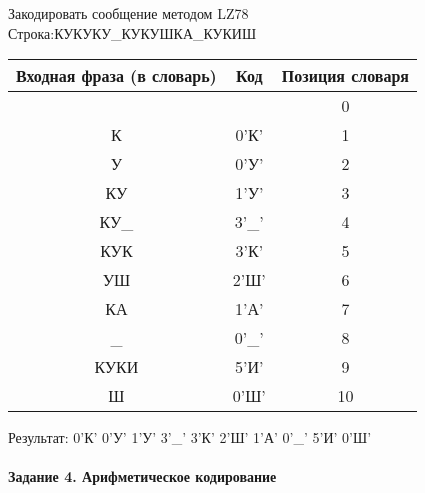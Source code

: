\documentclass[a4paper, 12pt]{article}
\begin{document}
Закодировать сообщение методом LZ78\\
Строка:КУКУКУ\_КУКУШКА\_КУКИШ\\
\begin{table}[h!]
\centering
\begin{tabular}{|c|c|c|} 
\hline
 Входная фраза (в словарь) & Код & Позиция словаря \\ \hline

 &  & 0 \\ \hline
К & 0'К' & 1 \\ \hline
У & 0'У' & 2 \\ \hline
КУ & 1'У' & 3 \\ \hline
КУ\_ & 3'\_' & 4 \\ \hline
КУК & 3'К' & 5 \\ \hline
УШ & 2'Ш' & 6 \\ \hline
КА & 1'А' & 7 \\ \hline
\_ & 0'\_' & 8 \\ \hline
КУКИ & 5'И' & 9 \\ \hline
Ш & 0'Ш' & 10 \\ \hline
\end{tabular}
\end{table}

Результат: 0'К' 0'У' 1'У' 3'\_' 3'К' 2'Ш' 1'А' 0'\_' 5'И' 0'Ш'\\
\pagebreak
\paragraph{Задание 4. Арифметическое кодирование\\}
\end{document}
